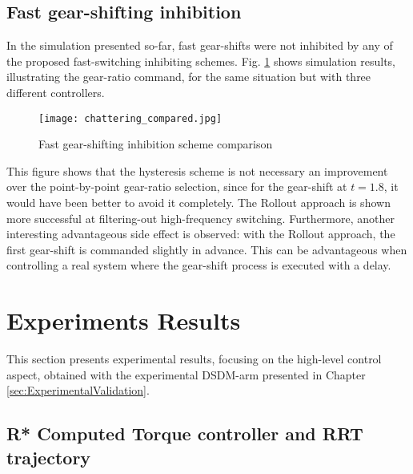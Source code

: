 \subsection{Fast gear-shifting inhibition}

In the simulation presented so-far, fast gear-shifts were not inhibited by any of the proposed fast-switching inhibiting schemes. Fig. \ref{fig:ChatteringComparaison} shows simulation results, illustrating the gear-ratio command, for the same situation but with three different controllers. 
%
\begin{figure}[htp]
	\centering
		\texttt{[image: chattering\_compared.jpg]}
	\caption{Fast gear-shifting inhibition scheme comparison}
	\label{fig:ChatteringComparaison}
\end{figure}

This figure shows that the hysteresis scheme is not necessary an improvement over the point-by-point gear-ratio selection, since for the gear-shift at $t=1.8$, it would have been better to avoid it completely. The Rollout approach is shown more successful at filtering-out high-frequency switching. Furthermore, another interesting advantageous side effect is observed: with the Rollout approach, the first gear-shift is commanded slightly in advance. This can be advantageous when controlling a real system where the gear-shift process is executed with a delay. 




\newpage
\section{Experiments Results}
\label{sec:shift_exp}

This section presents experimental results, focusing on the high-level control aspect, obtained with the experimental DSDM-arm presented in Chapter \ref{sec:ExperimentalValidation}.

\subsection{R* Computed Torque controller and RRT trajectory}


